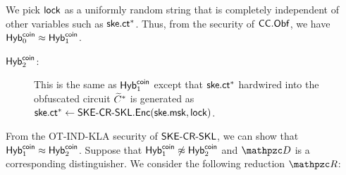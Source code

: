 We pick $\lock$ as a uniformly random string that is completely independent of other variables such as $\ske.\ct^*$.
Thus, from the security of $\CCObf$, we have $\Hyb_0^\coin \approx
\Hyb_1^\coin$.

\begin{description}
\item[$\hybi{2}^\coin$:]This is the same as $\hybi{1}^\coin$ except
that $\ske.\ct^*$ hardwired into the obfuscated circuit $\tlC^*$ is
generated as $\ske.\ct^*\gets\SKECRSKL.\Enc(\ske.\msk,\lock)$.
\end{description}

From the OT-IND-KLA security of $\SKECRSKL$, we can show that
$\hybi{1}^\coin \approx \hybi{2}^\coin$. Suppose that $\Hyb_1^\coin
\not \approx \Hyb_2^\coin$ and $\qD$ is a corresponding
distinguisher. We consider the following reduction
$\qR$:

